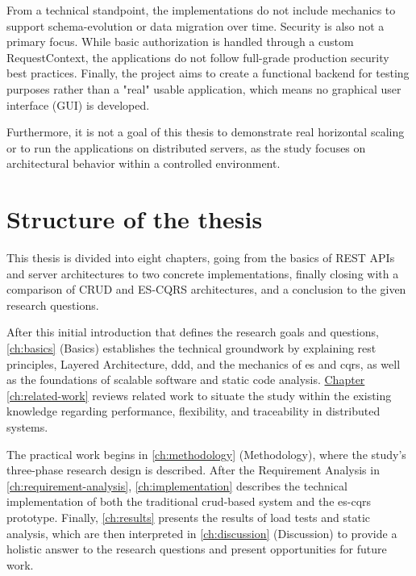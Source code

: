From a technical standpoint, the implementations do not include mechanics to support \gls{schema-evolution} or data migration over time. Security is also not a primary focus. While basic authorization is handled through a custom RequestContext, the applications do not follow full-grade production security best practices. Finally, the project aims to create a functional backend for testing purposes rather than a "real" usable application, which means no graphical user interface (GUI) is developed.

Furthermore, it is not a goal of this thesis to demonstrate real horizontal scaling or to run the applications on distributed servers, as the study focuses on architectural behavior within a controlled environment.

\section{Structure of the thesis}

This thesis is divided into eight chapters, going from the basics of REST APIs and server architectures to two concrete implementations, finally closing with a comparison of CRUD and ES-CQRS architectures, and a conclusion to the given research questions.

After this initial introduction that defines the research goals and questions, \autoref{ch:basics} (Basics) establishes the technical groundwork by explaining \acrshort{rest} principles, Layered Architecture, \gls{ddd}, and the mechanics of \acrlong{es} and \acrshort{cqrs}, as well as the foundations of scalable software and static code analysis. \hyperref[ch:related-work]{Chapter \ref*{ch:related-work}} reviews related work to situate the study within the existing knowledge regarding performance, flexibility, and traceability in distributed systems.

The practical work begins in \autoref{ch:methodology} (Methodology), where the study's three-phase research design is described. After the Requirement Analysis in \autoref{ch:requirement-analysis}, \autoref{ch:implementation} describes the technical implementation of both the traditional \acrshort{crud}-based system and the \acrshort{es}-\acrshort{cqrs} prototype. Finally, \autoref{ch:results} presents the results of load tests and static analysis, which are then interpreted in \autoref{ch:discussion} (Discussion) to provide a holistic answer to the research questions and present opportunities for future work.
